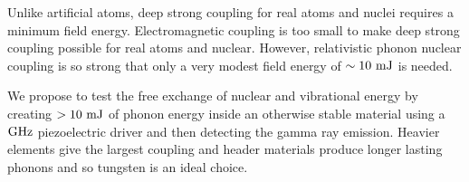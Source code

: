 \documentclass[
]{article}
\renewcommand{\[}{\begin{equation}}
\renewcommand{\]}{\end{equation}}
\begin{document}
Unlike artificial atoms, deep strong coupling for real atoms and nuclei
requires a minimum field energy. Electromagnetic coupling is too small
to make deep strong coupling possible for real atoms and nuclear.
However, relativistic phonon nuclear coupling is so strong that only a
very modest field energy of \(\sim \rm 10 \ mJ\) is needed.

We propose to test the free exchange of nuclear and vibrational energy
by creating \(>10 \ \rm mJ\) of phonon energy inside an otherwise stable
material using a \(\rm GHz\) piezoelectric driver and then detecting the
gamma ray emission. Heavier elements give the largest coupling and
header materials produce longer lasting phonons and so tungsten is an
ideal choice.

\printbibliography
\end{document}

